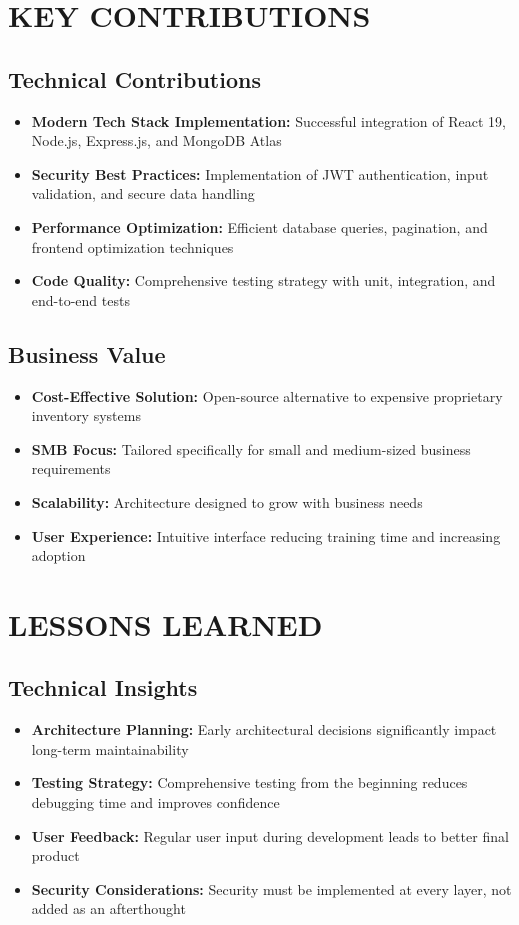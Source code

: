 \section{KEY CONTRIBUTIONS}

\subsection{Technical Contributions}
\begin{itemize}
\item \textbf{Modern Tech Stack Implementation:} Successful integration of React 19, Node.js, Express.js, and MongoDB Atlas
\item \textbf{Security Best Practices:} Implementation of JWT authentication, input validation, and secure data handling
\item \textbf{Performance Optimization:} Efficient database queries, pagination, and frontend optimization techniques
\item \textbf{Code Quality:} Comprehensive testing strategy with unit, integration, and end-to-end tests
\end{itemize}

\subsection{Business Value}
\begin{itemize}
\item \textbf{Cost-Effective Solution:} Open-source alternative to expensive proprietary inventory systems
\item \textbf{SMB Focus:} Tailored specifically for small and medium-sized business requirements
\item \textbf{Scalability:} Architecture designed to grow with business needs
\item \textbf{User Experience:} Intuitive interface reducing training time and increasing adoption
\end{itemize}

\section{LESSONS LEARNED}

\subsection{Technical Insights}
\begin{itemize}
\item \textbf{Architecture Planning:} Early architectural decisions significantly impact long-term maintainability
\item \textbf{Testing Strategy:} Comprehensive testing from the beginning reduces debugging time and improves confidence
\item \textbf{User Feedback:} Regular user input during development leads to better final product
\item \textbf{Security Considerations:} Security must be implemented at every layer, not added as an afterthought
\end{itemize}

